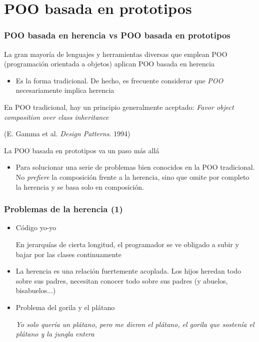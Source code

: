 \documentclass[ucs]{beamer}
\begin{document}
\section{POO basada en prototipos}
\begin{frame}[fragile]
\frametitle{POO basada en herencia vs POO basada en prototipos}

La gran mayoría de lenguajes y herramientas diversas que emplean
POO (programación orientada a objetos) aplican POO basada en herencia

    \begin{itemize}
    \item
Es la forma tradicional.
De hecho, es frecuente considerar que
\emph{POO} necesariamente implica herencia
    \end{itemize}


En POO tradicional, hay un principio generalmente aceptado:
\emph{Favor object composition over class inheritance}

(E. Gamma et al.  \emph{Design Patterns}. 1994)

La POO basada en prototipos 
va un paso más allá

\begin{itemize}
\item
Para solucionar una serie de problemas bien conocidos en la POO tradicional. 
No \emph{prefiere}
la composición frente  a la herencia, sino que omite por completo
la herencia y se basa solo en composición.
\end{itemize}

\end{frame}

\begin{frame}[fragile]
\frametitle{Problemas de la herencia (1)}
\begin{itemize}

\item
Código yo-yo

En jerarquías de cierta longitud, el programador se ve
obligado a subir y bajar por las clases continuamente

\item
La herencia es una relación fuertemente acoplada. Los hijos
heredan todo sobre sus padres, necesitan conocer todo sobre
sus padres (y abuelos, bisabuelos...)

\item
Problema del gorila y el plátano

\emph{Yo solo quería un plátano, pero me dieron el plátano, el  gorila que sostenía
el plátano y la jungla entera}

\end{itemize}
\end{frame}
\end{document}
